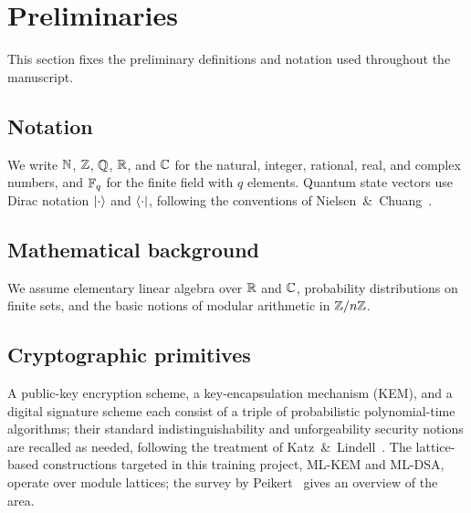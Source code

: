 \section{Preliminaries}
\label{sec:preliminaries}

This section fixes the preliminary definitions and notation used throughout
the manuscript.

\subsection{Notation}
\label{subsec:notation}

We write $\mathbb{N}$, $\mathbb{Z}$, $\mathbb{Q}$, $\mathbb{R}$, and $\mathbb{C}$ for the natural, integer,
rational, real, and complex numbers, and $\mathbb{F}_{q}$ for the finite field with
$q$ elements. Quantum state vectors use Dirac notation $\left\lvert \cdot \right\rangle$ and
$\left\langle \cdot \right\rvert$, following the conventions of
Nielsen~\&~Chuang~\cite{NielsenChuang2010}.

\subsection{Mathematical background}
\label{subsec:math-background}

We assume elementary linear algebra over $\mathbb{R}$ and $\mathbb{C}$, probability
distributions on finite sets, and the basic notions of modular arithmetic in
$\mathbb{Z}/n\mathbb{Z}$.

\subsection{Cryptographic primitives}
\label{subsec:crypto-primitives}

A public-key encryption scheme, a key-encapsulation mechanism (KEM), and a
digital signature scheme each consist of a triple of probabilistic
polynomial-time algorithms; their standard indistinguishability and
unforgeability security notions are recalled as needed, following the
treatment of Katz~\&~Lindell~\cite{KatzLindell2020}. The lattice-based
constructions targeted in this training project, ML-KEM and ML-DSA, operate
over module lattices; the survey by Peikert~\cite{Peikert2016} gives an
overview of the area.
